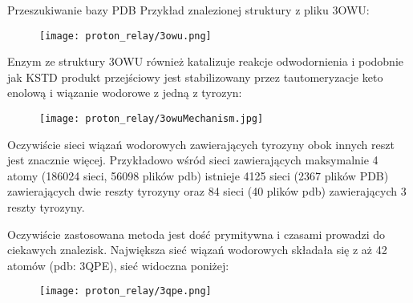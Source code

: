 \documentclass[10pt,a4paper]{article}
\begin{document}
\begin{section}{Przeszukiwanie bazy PDB}
 Przykład znalezionej struktury z pliku 3OWU:
 
  \begin{figure}[H]
  \texttt{[image: proton\_relay/3owu.png]}
\end{figure}

Enzym ze struktury 3OWU również katalizuje reakcje odwodornienia i podobnie jak KSTD produkt przejściowy jest stabilizowany przez tautomeryzacje keto enolową i wiązanie wodorowe z jedną z tyrozyn:

 \begin{figure}[H]
  \texttt{[image: proton\_relay/3owuMechanism.jpg]}
\end{figure}


Oczywiście sieci wiązań wodorowych zawierających tyrozyny obok innych reszt jest znacznie więcej. Przykładowo wśród sieci zawierających maksymalnie 4 atomy (186024 sieci, 56098 plików pdb) istnieje 
4125 sieci (2367 plików PDB) zawierających dwie reszty tyrozyny oraz 84 sieci (40 plików pdb) zawierających 3 reszty tyrozyny. 
 
 Oczywiście zastosowana metoda jest dość prymitywna i czasami prowadzi do ciekawych znalezisk. Największa sieć wiązań wodorowych składała się z aż 42 atomów (pdb: 3QPE), sieć widoczna poniżej:
 
   \begin{figure}[H]
  \texttt{[image: proton\_relay/3qpe.png]}
\end{figure}
 
\end{section}
\end{document}
